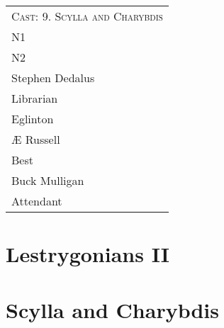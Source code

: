 \begin{tabular}{l p{5cm} l p{5cm}}
    \multicolumn{4}{c}{\Large \textsc{Cast: 9. Scylla and Charybdis}} \\
N1 \\  %
N2 \\  %
Stephen Dedalus \\
Librarian \\
Eglinton \\
Æ Russell \\
Best \\
Buck Mulligan \\
Attendant \\

\end{tabular}
\thispagestyle{empty}

\newpage


\setcounter{page}{1}
\setcounter{section}{7}  %

\section{Lestrygonians II}


\pagebreak

\section{Scylla and Charybdis}




